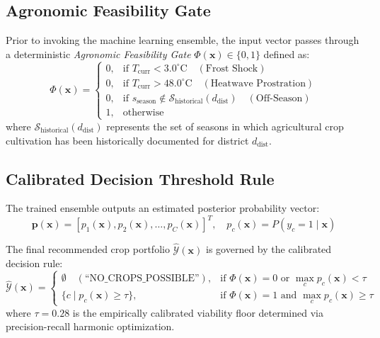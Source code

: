 \documentclass[conference]{IEEEtran}
\begin{document}
\subsection{Agronomic Feasibility Gate}
Prior to invoking the machine learning ensemble, the input vector passes through a deterministic \textit{Agronomic Feasibility Gate} $\Phi(\mathbf{x}) \in \{0, 1\}$ defined as:
\begin{equation}
\Phi(\mathbf{x}) = \begin{cases} 
0, & \text{if } T_{\text{curr}} < 3.0^\circ\text{C} \quad (\text{Frost Shock}) \\
0, & \text{if } T_{\text{curr}} > 48.0^\circ\text{C} \quad (\text{Heatwave Prostration}) \\
0, & \text{if } s_{\text{season}} \notin \mathcal{S}_{\text{historical}}(d_{\text{dist}}) \quad (\text{Off-Season}) \\
1, & \text{otherwise}
\end{cases}
\end{equation}
where $\mathcal{S}_{\text{historical}}(d_{\text{dist}})$ represents the set of seasons in which agricultural crop cultivation has been historically documented for district $d_{\text{dist}}$.

\subsection{Calibrated Decision Threshold Rule}
The trained ensemble outputs an estimated posterior probability vector:
\begin{equation}
\mathbf{p}(\mathbf{x}) = [p_1(\mathbf{x}), p_2(\mathbf{x}), \dots, p_C(\mathbf{x})]^T, \quad p_c(\mathbf{x}) = P(y_c = 1 \mid \mathbf{x})
\end{equation}

The final recommended crop portfolio $\hat{\mathcal{Y}}(\mathbf{x})$ is governed by the calibrated decision rule:
\begin{equation}
\hat{\mathcal{Y}}(\mathbf{x}) = \begin{cases} 
\emptyset \quad (\text{``NO\_CROPS\_POSSIBLE''}), & \text{if } \Phi(\mathbf{x}) = 0 \text{ or } \max_{c} p_c(\mathbf{x}) < \tau \\
\{ c \mid p_c(\mathbf{x}) \ge \tau \}, & \text{if } \Phi(\mathbf{x}) = 1 \text{ and } \max_{c} p_c(\mathbf{x}) \ge \tau
\end{cases}
\end{equation}
where $\tau = 0.28$ is the empirically calibrated viability floor determined via precision-recall harmonic optimization.
\end{document}
